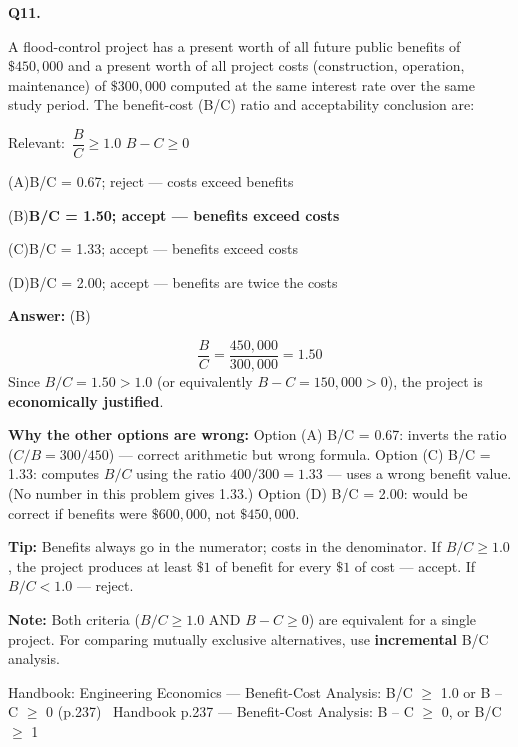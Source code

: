 \documentclass[11pt]{article}
\newcommand{\correct}[1]{\textbf{#1}\;{\color{accent}$\checkmark$}}
\newcommand{\optline}[2]{\par\noindent\hspace{1.2em}(#1)\hspace{0.6em}#2}
\begin{document}
\vspace{9pt}
\filbreak
\textbf{\color{accent}Q11.}\par\vspace{2pt}
A flood-control project has a present worth of all future public benefits of $\$450{,}000$ and a present worth of all project costs (construction, operation, maintenance) of $\$300{,}000$ computed at the same interest rate over the same study period. The benefit-cost (B/C) ratio and acceptability conclusion are:\par\par\vspace{3pt}
{\small\color{soft}Relevant:}\ $\dfrac{B}{C} \geq 1.0$ \quad $B - C \geq 0$\par\vspace{3pt}
\optline{A}{B/C = 0.67; reject --- costs exceed benefits}
\optline{B}{\correct{B/C = 1.50; accept --- benefits exceed costs}}
\optline{C}{B/C = 1.33; accept --- benefits exceed costs}
\optline{D}{B/C = 2.00; accept --- benefits are twice the costs}
\par\vspace{3pt}
\vspace{2pt}\par\noindent\colorbox{boxbg}{\parbox{\dimexpr\linewidth-2\fboxsep\relax}{%
\vspace{2pt}\textbf{Answer:} (B)\par\vspace{2pt}
{\small \[\frac{B}{C} = \frac{450{,}000}{300{,}000} = 1.50\]
Since $B/C = 1.50 > 1.0$ (or equivalently $B - C = 150{,}000 > 0$), the project is \textbf{economically justified}.\par
\textbf{Why the other options are wrong:} Option (A) B/C = 0.67: inverts the ratio ($C/B = 300/450$) --- correct arithmetic but wrong formula. Option (C) B/C = 1.33: computes $B/C$ using the ratio $400/300 = 1.33$ --- uses a wrong benefit value. (No number in this problem gives 1.33.) Option (D) B/C = 2.00: would be correct if benefits were $\$600{,}000$, not $\$450{,}000$.\par
\textbf{Tip:} Benefits always go in the numerator; costs in the denominator. If $B/C \ge 1.0$, the project produces at least $\$1$ of benefit for every $\$1$ of cost --- accept. If $B/C < 1.0$ --- reject.\par
\textbf{Note:} Both criteria ($B/C \ge 1.0$ AND $B - C \ge 0$) are equivalent for a single project. For comparing mutually exclusive alternatives, use \textbf{incremental} B/C analysis.\par}\par\vspace{2pt}
{\footnotesize\color{soft}Handbook: Engineering Economics --- Benefit-Cost Analysis: B/C $\ge$ 1.0 or B -- C $\ge$ 0 (p.237) \textbullet\ Handbook p.237 --- Benefit-Cost Analysis: B -- C $\ge$ 0, or B/C $\ge$ 1}\vspace{2pt}
}}
\end{document}
